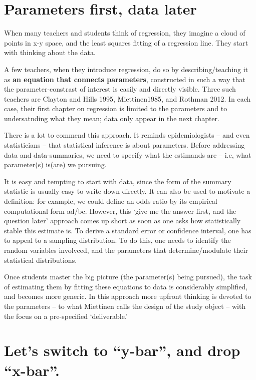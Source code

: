\documentclass[]{book}
\begin{document}
\hypertarget{parameters-first-data-later-1}{%
\section{Parameters first, data later}\label{parameters-first-data-later-1}}

When many teachers and students think of regression, they imagine a cloud of points in x-y space, and the least squares fitting of a regression line. They start with thinking about the data.

A few teachers, when they introduce regression, do so by describing/teaching it as \textbf{an equation that connects parameters}, constructed in such a way that the parameter-constrast of interest is easily and directly visible. Three such teachers are Clayton and Hills 1995, Miettinen1985, and Rothman 2012. In each case, their first chapter on regression is limited to the parameters and to undersatnding what they mean; data only appear in the next chapter.

There is a lot to commend this approach. It reminds epidemiologists -- and even statisticians -- that statistical inference is about parameters. Before addressing data and data-summaries, we need to specify what the estimands are -- i.e, what parameter(s) is(are) we pursuing.

It is easy and tempting to start with data, since the form of the summary statistic is usually easy to write down directly. It can also be used to motivate a definition: for example, we could define an odds ratio by its empirical computational form ad/bc. However, this `give me the answer first, and the question later' approach comes up short as soon as one asks how statistically stable this estimate is. To derive a standard error or confidence interval, one has to appeal to a sampling distribution. To do this, one needs to identify the random variables involvced, and the parameters that determine/modulate their statistical distributions.

Once students master the big picture (the parameter(s) being pursued), the task of estimating them by fitting these equations to data is considerably simplified, and becomes more generic. In this approach more upfront thinking is devoted to the parameters -- to what Miettinen calls the design of the study object -- with the focus on a pre-specified `deliverable.'

\hypertarget{lets-switch-to-y-bar-and-drop-x-bar.-1}{%
\section{Let's switch to ``y-bar'', and drop ``x-bar''.}\label{lets-switch-to-y-bar-and-drop-x-bar.-1}}
\end{document}
